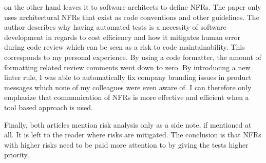 \cite{Lagerstedt2014} on the other hand leaves it to software architects to define \glspl{NFR}.
The paper only uses architectural \glspl{NFR} that exist as code conventions and other guidelines.
The author describes why having automated tests is a necessity of software development in regards to cost efficiency and how it mitigates human error during code review which can be seen as a risk to code maintainability.
This corresponds to my personal experience. 
By using a code formatter, the amount of formatting related review comments went down to zero.
By introducing a new linter rule, I was able to automatically fix company branding issues in product messages which none of my colleagues were even aware of.
I can therefore only emphasize that communication of \glspl{NFR} is more effective and  efficient when a tool based approach is used.


Finally, both articles mention risk analysis only as a side note, if mentioned at all.
It is left to the reader where risks are mitigated.
The conclusion is that \glspl{NFR} with higher risks need to be paid more attention to by giving the tests higher priority.

